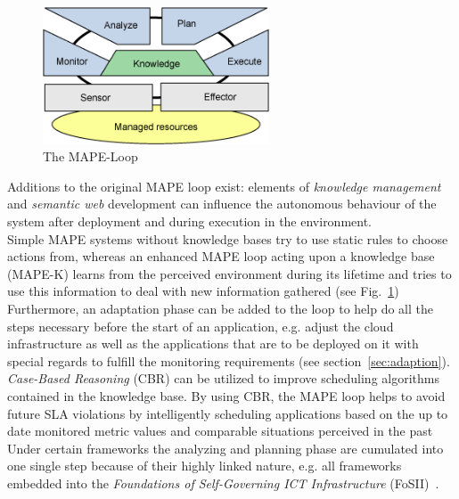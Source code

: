 \documentclass[a4paper]{llncs}
\begin{document}
\begin{figure}[Ht]
	\centering
		\includegraphics[width=0.6\textwidth]{figs/mape.png}
	\caption{The MAPE-Loop}
	\label{fig:mape}
\end{figure}

Additions to the original MAPE loop exist: elements of \textit{knowledge management} and \textit{semantic web} development can influence the autonomous behaviour of the system after deployment and during execution in the environment.\\
Simple MAPE systems without knowledge bases try to use static rules to choose actions from, whereas an enhanced MAPE loop acting upon a knowledge base (MAPE-K) learns from the perceived environment during its lifetime and tries to use this information to deal with new information gathered (see Fig.~\ref{fig:mape})\\
Furthermore, an adaptation phase can be added to the loop to help do all the steps necessary before the start of an application, e.g. adjust the cloud infrastructure as well as the applications that are to be deployed on it with special regards to fulfill the monitoring requirements (see section~\ref{sec:adaption})\cite{Maurer11}.\\
\textit{Case-Based Reasoning} (CBR) can be utilized to improve scheduling algorithms contained in the knowledge base. By using CBR, the MAPE loop helps to avoid future SLA violations by intelligently scheduling applications based on the up to date monitored metric values and comparable situations perceived in the past~\cite{Maurer10}\cite{Maurer11}\\
Under certain frameworks the analyzing and planning phase are cumulated into one single step  because of their highly linked nature, e.g. all frameworks embedded into the \textit{Foundations of Self-Governing ICT Infrastructure} (FoSII)~\cite{Maurer11}\cite{Emeakaroha10a}\cite{Emeakaroha10b}.
\end{document}
